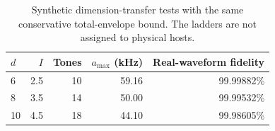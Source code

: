 \begin{table}[htbp]
\centering
\small
\setlength{\tabcolsep}{4pt}
\caption{Synthetic dimension-transfer tests with the same conservative total-envelope bound. The ladders are not assigned to physical hosts.}\label{tab:dim}
\begin{tabular}{lrrrr}
\toprule
$d$ & $I$ & Tones & $a_{\max}$ (kHz) & Real-waveform fidelity \\
\midrule
6 & 2.5 & 10 & 59.16 & 99.99882\% \\
8 & 3.5 & 14 & 50.00 & 99.99532\% \\
10 & 4.5 & 18 & 44.10 & 99.98605\% \\
\bottomrule
\end{tabular}
\end{table}
